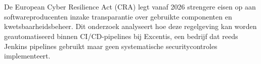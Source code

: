 
%
%
%
%
%

%



\chapter*{}

De European Cyber Resilience Act (CRA) legt vanaf 2026 strengere eisen op aan softwareproducenten inzake transparantie over gebruikte componenten en kwetsbaarheidsbeheer. Dit onderzoek analyseert hoe deze regelgeving kan worden geautomatiseerd binnen CI/CD-pipelines bij Excentis, een bedrijf dat reeds Jenkins pipelines gebruikt maar geen systematische securitycontroles implementeert.

